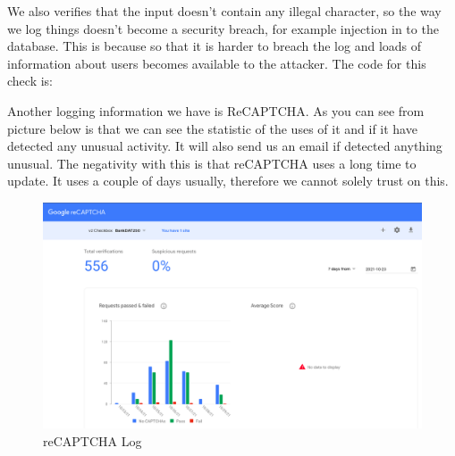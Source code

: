 We also verifies that the input doesn’t contain any illegal character, so the way we log things doesn’t become a security breach, for example injection in to the database. This is because so that it is harder to breach the log and loads of information about users becomes available to the attacker. The code for this check is: 

\pagebreak
{}

Another logging information we have is ReCAPTCHA. As you can see from picture below is that we can see the statistic of the uses of it and if it have detected any unusual activity. It will also send us an email if detected anything unusual. The negativity with this is that reCAPTCHA uses a long time to update. It uses a couple of days usually, therefore we cannot solely trust on this. 

\begin{figure}[H]
    \centering
    \includegraphics[width=\textwidth]{pics/recaptchaLog.png}
    \caption{reCAPTCHA Log}
    \label{fig:cha3fig1recaptchalog}
\end{figure}
